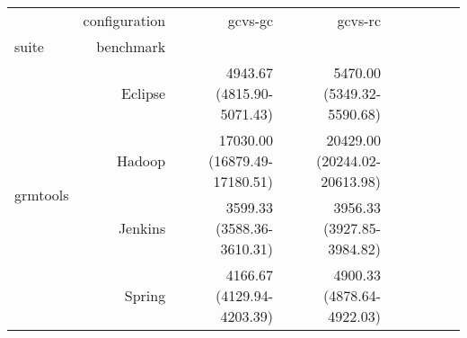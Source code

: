\begin{tabular}{lrrrrrrrr}
\toprule
 & configuration & gcvs-gc & gcvs-rc \\
suite & benchmark &  &  \\
\midrule
\multirow[t]{4}{*}{grmtools} & Eclipse & 4943.67 \footnotesize{(4815.90-5071.43)} & 5470.00 \footnotesize{(5349.32-5590.68)} \\
 & Hadoop & 17030.00 \footnotesize{(16879.49-17180.51)} & 20429.00 \footnotesize{(20244.02-20613.98)} \\
 & Jenkins & 3599.33 \footnotesize{(3588.36-3610.31)} & 3956.33 \footnotesize{(3927.85-3984.82)} \\
 & Spring & 4166.67 \footnotesize{(4129.94-4203.39)} & 4900.33 \footnotesize{(4878.64-4922.03)} \\
\cline{1-4}
\bottomrule
\end{tabular}

